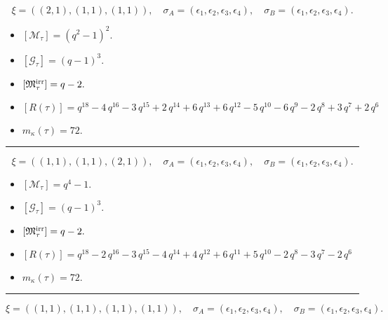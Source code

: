 \documentclass[10pt,a4paper]{amsart}
\begin{document}
$$\xi = ({(2, 1)}, {(1, 1), (1, 1)}),\quad \sigma_A = ({{\epsilon_1, \epsilon_2}}, {{\epsilon_3}, {\epsilon_4}}),\quad \sigma_B = ({{\epsilon_1, \epsilon_2}}, {{\epsilon_3}, {\epsilon_4}}).$$

\begin{itemize}
 \item $[\mathcal{M}_{\tau}] = {\left(q^{2} - 1\right)}^{2} .$

 \item $[\mathcal{G}_{\tau}] = {\left(q - 1\right)}^{3} .$

 \item $[{\frak M}_{\tau}^{\textrm{irr}}] = q - 2 .$

 \item $[R(\tau)] = q^{18} - 4 \, q^{16} - 3 \, q^{15} + 2 \, q^{14} + 6 \, q^{13} + 6 \, q^{12} - 5 \, q^{10} - 6 \, q^{9} - 2 \, q^{8} + 3 \, q^{7} + 2 \, q^{6} $

 \item $m_{\kappa}(\tau) = 72 .$

 \end{itemize}
\noindent\rule{8cm}{0.4pt}

$$\xi = ({(1, 1), (1, 1)}, {(2, 1)}),\quad \sigma_A = ({{\epsilon_1}, {\epsilon_2}}, {{\epsilon_3, \epsilon_4}}),\quad \sigma_B = ({{\epsilon_1}, {\epsilon_2}}, {{\epsilon_3, \epsilon_4}}).$$

\begin{itemize}
 \item $[\mathcal{M}_{\tau}] = q^{4} - 1 .$

 \item $[\mathcal{G}_{\tau}] = {\left(q - 1\right)}^{3} .$

 \item $[{\frak M}_{\tau}^{\textrm{irr}}] = q - 2 .$

 \item $[R(\tau)] = q^{18} - 2 \, q^{16} - 3 \, q^{15} - 4 \, q^{14} + 4 \, q^{12} + 6 \, q^{11} + 5 \, q^{10} - 2 \, q^{8} - 3 \, q^{7} - 2 \, q^{6} $

 \item $m_{\kappa}(\tau) = 72 .$

 \end{itemize}
\noindent\rule{8cm}{0.4pt}

$$\xi = ({(1, 1), (1, 1)}, {(1, 1), (1, 1)}),\quad \sigma_A = ({{\epsilon_1}, {\epsilon_2}}, {{\epsilon_3}, {\epsilon_4}}),\quad \sigma_B = ({{\epsilon_1}, {\epsilon_2}}, {{\epsilon_3}, {\epsilon_4}}).$$
\end{document}
